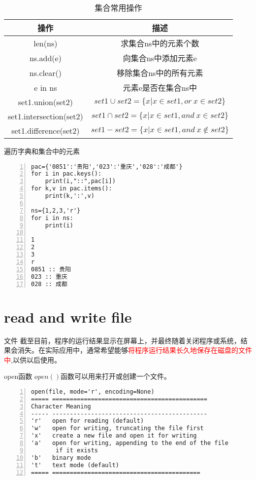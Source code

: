 \documentclass{beamer}
\begin{document}
\begin{frame}
\begin{table}[htp]
\caption{集合常用操作}
\begin{center}
\begin{tabular}{cc}
\toprule
\textbf{操作}&\textbf{描述}\\
\midrule
len(ns)&求集合ns中的元素个数\\
ns.add(e)&向集合ns中添加元素e\\
ns.clear()&移除集合ns中的所有元素\\
e in ns&元素e是否在集合ns中\\
set1.union(set2)&$set1\cup set2=\{x|x\in set1,or\ x\in set2\}$\\
set1.intersection(set2)&$set1\cap set2=\{x|x\in set1,and\  x\in set2\}$\\
set1.difference(set2)&$set1-set2=\{x|x\in set1,and\  x\notin set2\}$\\
\bottomrule
\end{tabular}
\end{center}
\label{dict}
\end{table}%
\end{frame}
\begin{frame}[fragile]{遍历字典和集合中的元素}
\small{
\begin{Verbatim}[numbers=left,frame=single,rulecolor=\color{red}]
pac={'0851':'贵阳','023':'重庆','028':'成都'}
for i in pac.keys():
    print(i,"::",pac[i])
for k,v in pac.items():
    print(k,':',v)
    
ns={1,2,3,'r'}
for i in ns:
    print(i)

1
2
3
r
0851 :: 贵阳
023 :: 重庆
028 :: 成都
\end{Verbatim}
}
\end{frame}

\section{read and write file}
\begin{frame}{文件}
截至目前，程序的运行结果显示在屏幕上，并最终随着关闭程序或系统，结果会消失。在实际应用中，通常希望能够\textcolor{red}{将程序运行结果长久地保存在磁盘的文件中},以供以后使用。
\end{frame}
\begin{frame}[fragile]{open函数}
$open()$函数可以用来打开或创建一个文件。
\small{
\begin{Verbatim}[numbers=left,frame=single,rulecolor=\color{red}]
open(file, mode='r', encoding=None)
===== ============================================
Character Meaning
----- --------------------------------------------
'r'   open for reading (default)
'w'   open for writing, truncating the file first
'x'   create a new file and open it for writing
'a'   open for writing, appending to the end of the file
       if it exists
'b'   binary mode
't'   text mode (default)
===== ==========================================
\end{Verbatim}
}
\end{frame}
\end{document}
